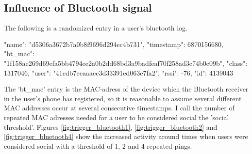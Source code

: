 \subsection{Influence of Bluetooth signal}
\label{sec:trigger_bluetooth}
The following is a randomized entry in a user's bluetooth log.
\begin{snippet}
	{
		"name": "d5306a3672b7a0b8f9696d294ec4b731", 
		"timestamp": 6870156680, 
		"bt_mac": "1f158ae269d69efa5bb4794ee2a0b2dd68bd3a9badfeaf70f258ad3c74b0c09b", 
		"class": 1317046, 
		"user": "41cdb7ecaaaec3d33391ed063e7fa2", 
		"rssi": -76, 
		"id": 4139043
	}
\end{snippet}
The 'bt\_mac' entry is the MAC-adress of the device which the Bluetooth receiver in the user's phone has registered, so it is reasonable to assume several different MAC addresses occur at several consecutive timestamps. I call the number of repeated MAC adresses needed for a user to be considered social the 'social threshold'. Figures \ref{fig:trigger_bluetooth1}, \ref{fig:trigger_bluetooth2} and \ref{fig:trigger_bluetooth4} show the increased activity around times when users were considered social with a threshold of 1, 2 and 4 repeated pings.
